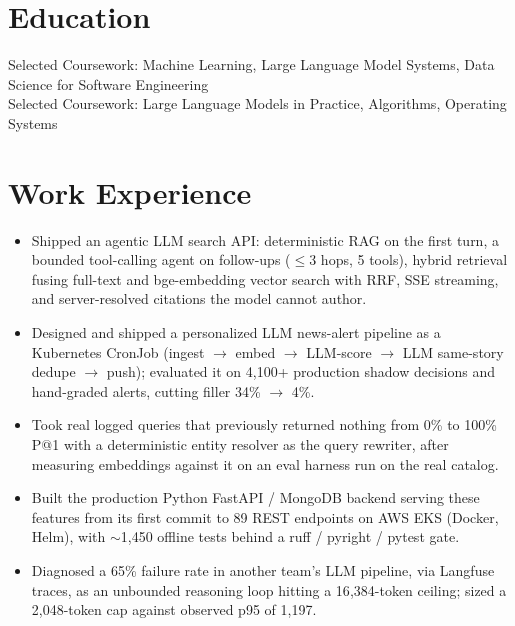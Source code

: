 \documentclass[11pt, letterpaper]{article}
\begin{document}

\section{Education}
Selected Coursework: Machine Learning, Large Language Model Systems, Data Science for Software Engineering\\[1pt]
Selected Coursework: Large Language Models in Practice, Algorithms, Operating Systems

\section{Work Experience}
\begin{itemize}
  \item Shipped an agentic LLM search API: deterministic RAG on the first turn, a bounded tool-calling agent on follow-ups ($\le$3 hops, 5 tools), hybrid retrieval fusing full-text and bge-embedding vector search with RRF, SSE streaming, and server-resolved citations the model cannot author.
  \item Designed and shipped a personalized LLM news-alert pipeline as a Kubernetes CronJob (ingest $\to$ embed $\to$ LLM-score $\to$ LLM same-story dedupe $\to$ push); evaluated it on 4{,}100+ production shadow decisions and hand-graded alerts, cutting filler 34\% $\to$ 4\%.
  \item Took real logged queries that previously returned nothing from 0\% to 100\% P@1 with a deterministic entity resolver as the query rewriter, after measuring embeddings against it on an eval harness run on the real catalog.
  \item Built the production Python FastAPI / MongoDB backend serving these features from its first commit to 89 REST endpoints on AWS EKS (Docker, Helm), with $\sim$1{,}450 offline tests behind a ruff / pyright / pytest gate.
  \item Diagnosed a 65\% failure rate in another team's LLM pipeline, via Langfuse traces, as an unbounded reasoning loop hitting a 16{,}384-token ceiling; sized a 2{,}048-token cap against observed p95 of 1{,}197.
\end{itemize}
\end{document}
